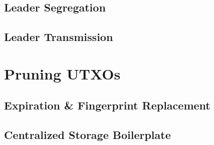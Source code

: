\documentclass[a4paper,11pt]{article}
\begin{document}
\subsection{Leader Segregation}

\subsection{Leader Transmission}

\section{Pruning UTXOs}

\subsection{Expiration \& Fingerprint Replacement}
\subsection{Centralized Storage Boilerplate}
\end{document}
